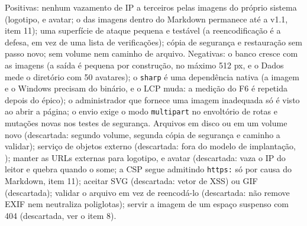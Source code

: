 {Positivas: nenhum vazamento de IP a terceiros pelas imagens do próprio sistema (logotipo,  e avatar; o das imagens dentro do Markdown permanece até a v1.1, item 11); uma superfície de ataque pequena e testável (a reencodificação é a defesa, em vez de uma lista de verificações); cópia de segurança e restauração sem passo novo; sem volume nem caminho de arquivo. Negativas: o banco cresce com as imagens (a saída é pequena por construção, no máximo 512 px, e o Dados mede o diretório com 50 avatares); o \texttt{sharp} é uma dependência nativa (a imagem e o Windows precisam do binário, e o LCP muda: a medição do F6 é repetida depois do épico); o administrador que fornece uma imagem inadequada só é visto ao abrir a página; o envio exige o modo \texttt{multipart} no envoltório de rotas e mutações novas nos testes de segurança.}
{Arquivos em disco ou em um volume novo (descartada: segundo volume, segunda cópia de segurança e caminho a validar); serviço de objetos externo (descartada: fora do modelo de implantação, ); manter as URLs externas para logotipo,  e avatar (descartada: vaza o IP do leitor e quebra quando o  some; a CSP segue admitindo \texttt{https:} só por causa do Markdown, item 11); aceitar SVG (descartada: vetor de XSS) ou GIF (descartada); validar o arquivo em vez de reencodá-lo (descartada: não remove EXIF nem neutraliza poliglotas); servir a imagem de um espaço suspenso com 404 (descartada, ver o item 8).}

